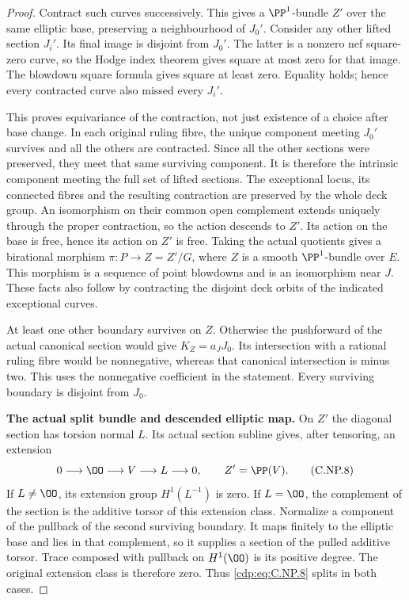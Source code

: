 \begin{proof}
Contract such curves
successively. This gives
a \(\PP^1\)-bundle \(Z'\)
over the same elliptic
base, preserving a
neighbourhood of \(J_0'\).
Consider any other
lifted section \(J_i'\).
Its final image is
disjoint from \(J_0'\).
The latter is a nonzero
nef square-zero curve,
so the Hodge index
theorem gives square
at most zero for that
image. The blowdown
square formula gives
square at least zero.
Equality holds; hence
every contracted curve
also missed every
\(J_i'\).

This proves equivariance
of the contraction, not
just existence of a
choice after base change.
In each original ruling
fibre, the unique component
meeting \(J_0'\) survives
and all the others are
contracted. Since all the
other sections were
preserved, they meet
that same surviving
component. It is
therefore the intrinsic
component meeting the
full set of lifted
sections. The exceptional
locus, its connected
fibres and the resulting
contraction are preserved
by the whole deck group.
An isomorphism on their
common open complement
extends uniquely through
the proper contraction,
so the action descends
to \(Z'\).
Its action on the base
is free, hence its
action on \(Z'\) is
free. Taking the actual
quotients gives a
birational morphism
\(\pi:P\to Z=Z'/G\),
where \(Z\) is a smooth
\(\PP^1\)-bundle over
\(E\). This morphism
is a sequence of point
blowdowns and is an
isomorphism near \(J\).
These facts also follow
by contracting the
disjoint deck orbits
of the indicated
exceptional curves.

At least one other
boundary survives on
\(Z\). Otherwise the
pushforward of the
actual canonical section
would give \(K_Z=a_JJ_0\).
Its intersection with
a rational ruling fibre
would be nonnegative,
whereas that canonical
intersection is minus two.
This uses the
nonnegative coefficient
in the statement.
Every surviving boundary
is disjoint from \(J_0\).

\par\medskip\noindent\textbf{The actual split bundle and descended elliptic map.}
On \(Z'\) the diagonal
section has torsion
normal \(L\). Its actual
section subline gives,
after tensoring, an
extension
\[
           0\longrightarrow\OO
             \longrightarrow V
             \longrightarrow L\longrightarrow0,
                  \qquad Z'=\PP(V).
 \tag{C.NP.8}\label{cdp:eq:C.NP.8}
\]
If \(L\ne\OO\), its
extension group
\(H^1(L^{-1})\) is zero.
If \(L=\OO\), the
complement of the section
is the additive torsor
of this extension class.
Normalize a component
of the pullback of the
second surviving boundary.
It maps finitely to the
elliptic base and lies
in that complement,
so it supplies a section
of the pulled additive
torsor. Trace composed
with pullback on
\(H^1(\OO)\) is its
positive degree.
The original extension
class is therefore zero.
Thus \eqref{cdp:eq:C.NP.8} splits
in both cases.


\end{proof}
